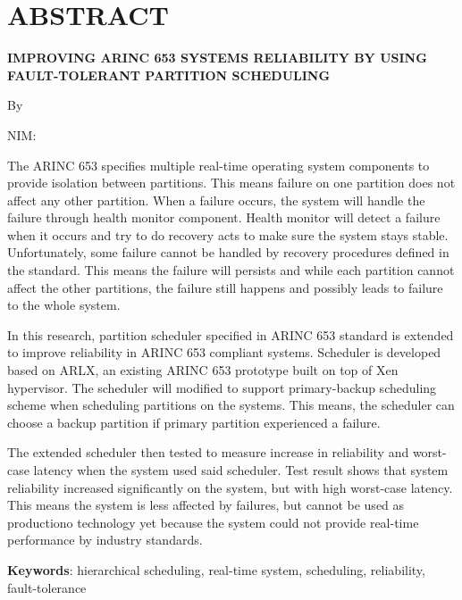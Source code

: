 \clearpage
\chapter*{ABSTRACT}

\begin{center}

	\large \bfseries
	\MakeUppercase{Improving ARINC 653 Systems Reliability by Using Fault-Tolerant Partition Scheduling}

	\normalsize \normalfont By

	\large \penulis

	\large NIM: \nimpenulis

\end{center}

\singlespacing

The ARINC 653 specifies multiple real-time operating system components to provide isolation between
partitions. This means failure on one partition does not affect any other partition. When a
failure occurs, the system will handle the failure through health monitor component. Health
monitor will detect a failure when it occurs and try to do recovery acts to make sure the system
stays stable.  Unfortunately, some failure cannot be handled by recovery procedures defined in
the standard.  This means the failure will persists and while each partition cannot affect the
other partitions, the failure still happens and possibly leads to failure to the whole system. 

In this research, partition scheduler specified in ARINC 653 standard is extended to improve
reliability in ARINC 653 compliant systems. Scheduler is developed based on ARLX, an existing
ARINC 653 prototype built on top of Xen hypervisor. The scheduler will modified to support
primary-backup scheduling scheme when scheduling partitions on the systems. This means, the
scheduler can choose a backup partition if primary partition experienced a failure.

The extended scheduler then tested to measure increase in reliability and worst-case latency when
the system used said scheduler. Test result shows that system reliability increased
significantly on the system, but with high worst-case latency. This means the system is less
affected by failures, but cannot be used as productiono technology yet because the system could
not provide real-time performance by industry standards.

\textbf{Keywords}: hierarchical scheduling, real-time system,
scheduling, reliability, fault-tolerance

\clearpage

